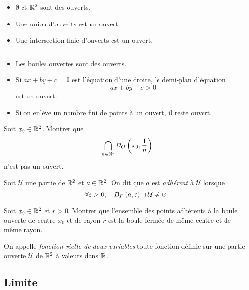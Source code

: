 \documentclass{magnolia}
\begin{document}
\begin{proposition}
$\quad$
\begin{itemize}
\item $\emptyset$ et $\mathbb{R}^2$ sont des ouverts.
\item Une union d'ouverts est un ouvert.
\item Une intersection finie d'ouverts est un ouvert.
\end{itemize}
\end{proposition}

\begin{proposition}
$\quad$
\begin{itemize}
\item Les boules ouvertes sont des ouverts.
\item Si $ax+by+c=0$ est l'équation d'une droite, le demi-plan d'équation
  \[ax+by+c>0\]
  est un ouvert.
\item Si on enlève un nombre fini de points à un ouvert, il reste ouvert.
\end{itemize}
\end{proposition}

\begin{exoUnique}
\exo Soit $x_0\in\mathbb{R}^2$. Montrer que
  \[\bigcap_{n\in{\mathbb{N}^*}} B_O\left(x_0,\frac{1}{n}\right)\]
  n'est pas un ouvert.
\end{exoUnique}

\begin{definition}
Soit $\mathcal{U}$ une partie de $\mathbb{R}^2$ et $a\in\mathbb{R}^2$. On dit que $a$ est
\emph{adhérent} à $\mathcal{U}$ lorsque
\[\forall\varepsilon>0 ,\quad B_F\left(a,\varepsilon\right)\cap\mathcal{U}\neq\varnothing.\]
\end{definition}

\begin{exoUnique}
\exemple Soit $x_0\in\mathbb{R}^2$ et $r>0$. Montrer que l'ensemble des points adhérents à
  la boule ouverte de centre $x_0$ et de rayon $r$ est la boule fermée de
  même centre et de même rayon.
\end{exoUnique}


\begin{definition}
On appelle \emph{fonction réelle de deux variables} toute fonction définie sur une
partie ouverte $\mathcal{U}$ de $\mathbb{R}^2$ à valeurs dans $\mathbb{R}$.
\end{definition}

\subsection{Limite}
\end{document}
